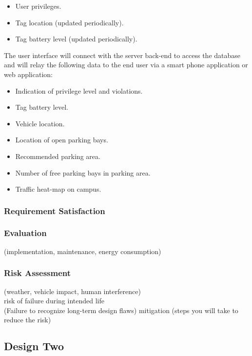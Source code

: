 \begin{itemize}
\item User privileges.
\item Tag location (updated periodically).
\item Tag battery level (updated periodically).
\end{itemize}

The user interface will connect with the server back-end to access the database and will relay the following data to the end user via a smart phone application or web application: 
\begin{itemize}
\item Indication of privilege level and violations.
\item Tag battery level.
\item Vehicle location.
\item Location of open parking bays.
\item Recommended parking area.
\item Number of free parking bays in parking area.
\item Traffic heat-map on campus.
\end{itemize}

\subsubsection{Requirement Satisfaction}

\subsubsection{Evaluation}
(implementation, maintenance, energy consumption) \\

\subsubsection{Risk Assessment}
(weather, vehicle impact, human interference) \\
risk of failure during intended life \\
(Failure to recognize long-term design flaws)
mitigation (steps you will take to reduce the risk) \\

\subsection{Design Two}
